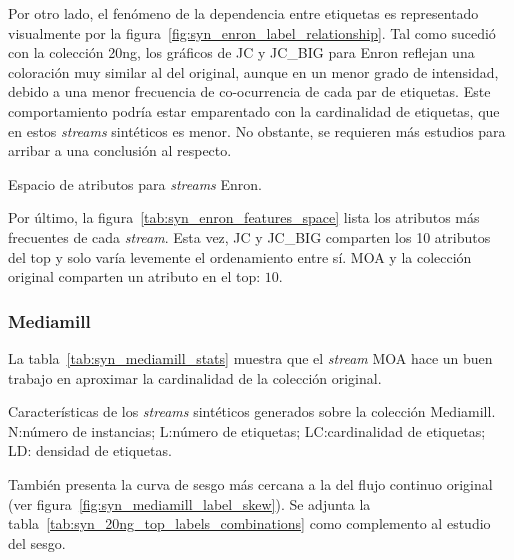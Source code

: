 Por otro lado, el fenómeno de la dependencia entre etiquetas es representado
visualmente por la figura~\ref{fig:syn_enron_label_relationship}. Tal como
sucedió con la colección 20ng, los gráficos de JC y JC\_BIG para Enron reflejan
una coloración muy similar al del original, aunque en un menor grado de
intensidad, debido a una menor frecuencia de co-ocurrencia de cada par de
etiquetas. Este comportamiento podría estar emparentado con la cardinalidad de
etiquetas, que en estos \textit{streams} sintéticos es menor. No obstante, se
requieren más estudios para arribar a una conclusión al respecto.

\begin{table}[htbp]
	\centering
	\begin{adjustbox}{max width=\textwidth}
		
	\end{adjustbox}
	\caption{Espacio de atributos para \textit{streams} Enron.}
	\label{tab:syn_enron_features_space}
\end{table}

Por último, la figura~\ref{tab:syn_enron_features_space} lista los atributos más
frecuentes de cada \textit{stream}. Esta vez, JC y JC\_BIG comparten los 10
atributos del top y solo varía levemente el ordenamiento entre sí. MOA y la
colección original comparten un atributo en el top: $10$.

\clearpage

\subsubsection{Mediamill}

La tabla~\ref{tab:syn_mediamill_stats} muestra que el \textit{stream} MOA hace
un buen trabajo en aproximar la cardinalidad de la colección original.

\bigskip
\begin{table}[htbp]
	\centering
	\begin{adjustbox}{max width=\textwidth}
		
	\end{adjustbox}
	\caption[Características de los \textit{streams} sintéticos generados sobre
		la colección Mediamill.]{Características de los \textit{streams}
		sintéticos generados sobre la colección Mediamill.  N:\@ número de
		instancias; L:\@ número de etiquetas; LC:\@ cardinalidad de etiquetas; LD:\@
		densidad de etiquetas.}
	\label{tab:syn_mediamill_stats}
\end{table}

También presenta la curva de sesgo más cercana a la del flujo continuo original
(ver figura~\ref{fig:syn_mediamill_label_skew}). Se adjunta la
tabla~\ref{tab:syn_20ng_top_labels_combinations} como complemento al estudio del
sesgo.

